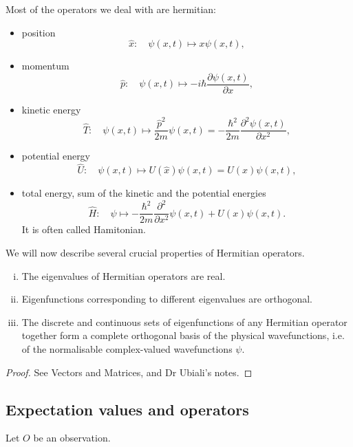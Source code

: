 \documentclass[a4paper]{article}
\begin{document}
Most of the operators we deal with are hermitian: 
\begin{example}
    \begin{itemize}
        \item position
        \[
        \hat{x}: \quad \psi(x, t) \mapsto x \psi(x, t),
        \]
        \item momentum
        \[
        \hat{p}: \quad \psi(x, t) \mapsto-i \hbar \frac{\partial \psi(x, t)}{\partial x} ,
        \]
        \item kinetic energy
        \[
        \hat{T}: \quad \psi(x, t) \mapsto \frac{\hat{p}^2}{2 m} \psi(x, t)=-\frac{\hbar^2}{2 m} \frac{\partial^2 \psi(x, t)}{\partial x^2},
        \]
        \item potential energy
        \[
        \hat{U}: \quad \psi(x, t) \mapsto U(\hat{x}) \psi(x, t)=U(x) \psi(x, t),
        \]
        \item total energy, sum of the kinetic and the potential energies
        \[
        \hat{H}: \quad \psi \mapsto-\frac{\hbar^2}{2 m} \frac{\partial^2}{\partial x^2} \psi(x, t)+U(x) \psi(x, t) .
        \]
        It is often called Hamitonian. 
    \end{itemize}
\end{example}

We will now describe several crucial properties of Hermitian operators.

\begin{theorem}\label{thm:2.6}
    \begin{enumerate}[(i)]
        \item The eigenvalues of Hermitian operators are real. 
        \item Eigenfunctions corresponding to different eigenvalues are orthogonal. 
        \item The discrete and continuous sets of eigenfunctions of any Hermitian operator together form a complete orthogonal basis of the physical wavefunctions, i.e. of the normalisable complex-valued wavefunctions $ \psi $. 
    \end{enumerate}
\end{theorem}
\begin{proof}
    See Vectors and Matrices, and Dr Ubiali's notes. 
\end{proof}

\subsection{Expectation values and operators}
Let $O$ be an observation. 
\end{document}

